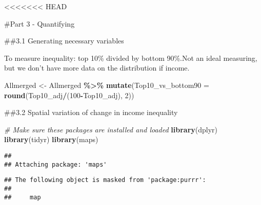\documentclass[
]{article}
\newenvironment{Shaded}{\begin{snugshade}}{\end{snugshade}}
\newcommand{\AttributeTok}[1]{\textcolor[rgb]{0.13,0.29,0.53}{#1}}
\newcommand{\CommentTok}[1]{\textcolor[rgb]{0.56,0.35,0.01}{\textit{#1}}}
\newcommand{\DecValTok}[1]{\textcolor[rgb]{0.00,0.00,0.81}{#1}}
\newcommand{\FunctionTok}[1]{\textcolor[rgb]{0.13,0.29,0.53}{\textbf{#1}}}
\newcommand{\NormalTok}[1]{#1}
\newcommand{\OtherTok}[1]{\textcolor[rgb]{0.56,0.35,0.01}{#1}}
\newcommand{\SpecialCharTok}[1]{\textcolor[rgb]{0.81,0.36,0.00}{\textbf{#1}}}
\begin{document}
\textless\textless\textless\textless\textless\textless\textless{} HEAD

\#Part 3 - Quantifying

\#\#3.1 Generating necessary variables

To measure inequality: top 10\% divided by bottom 90\%.Not an ideal
measuring, but we don't have more data on the distribution if income.

\begin{Shaded}
\begin{Highlighting}[]
\NormalTok{Allmerged }\OtherTok{\textless{}{-}}\NormalTok{ Allmerged }\SpecialCharTok{\%\textgreater{}\%}
  \FunctionTok{mutate}\NormalTok{(}\AttributeTok{Top10\_vs\_bottom90 =} \FunctionTok{round}\NormalTok{(Top10\_adj}\SpecialCharTok{/}\NormalTok{(}\DecValTok{100}\SpecialCharTok{{-}}\NormalTok{Top10\_adj), }\DecValTok{2}\NormalTok{))}
\end{Highlighting}
\end{Shaded}

\#\#3.2 Spatial variation of change in income inequality

\begin{Shaded}
\begin{Highlighting}[]
\CommentTok{\# Make sure these packages are installed and loaded}
\FunctionTok{library}\NormalTok{(dplyr)}
\FunctionTok{library}\NormalTok{(tidyr)}
\FunctionTok{library}\NormalTok{(maps)}
\end{Highlighting}
\end{Shaded}

\begin{verbatim}
## 
## Attaching package: 'maps'
\end{verbatim}

\begin{verbatim}
## The following object is masked from 'package:purrr':
## 
##     map
\end{verbatim}
\end{document}
